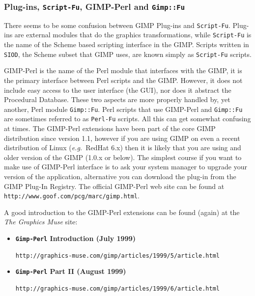 \documentclass[twoside,11pt]{article}
\newcommand{\htmladdnormallink}[2]{#1}
\newcommand{\latex}[1]{#1}
\begin{document}
\subsubsection{Plug-ins, {\tt Script-Fu}, GIMP-Perl and {\tt Gimp::Fu}}

There seems to be some confusion between GIMP Plug-ins and {\tt Script-Fu}.  Plug-ins are external modules that do the graphics transformations, while  {\tt Script-Fu} is the name of the Scheme based scripting interface in the GIMP.  Scripts written in {\tt SIOD}, the Scheme subset that GIMP uses, are known simply as {\tt Script-Fu} scripts.

\htmladdnormallink{GIMP-Perl}{http://www.goof.com/pcg/marc/gimp.html} is the name of the Perl module that interfaces with the GIMP, it is the primary interface between Perl scripts and the GIMP. However, it does not include easy access to the user interface (the GUI), nor does it abstract the Procedural Database. These two aspects are more properly handled by, yet another, Perl module {\tt Gimp::Fu}. Perl scripts that use GIMP-Perl and {\tt Gimp::Fu} are sometimes referred to as {\tt Perl-Fu} scripts. All this can get somewhat confusing at times. The GIMP-Perl extensions have been part of the core GIMP distribution since version 1.1, however if you are using GIMP on even a recent distribution of Linux ({\em e.g.\ }RedHat 6.x) then it is likely that you are using and older version of the GIMP (1.0.x or below). The simplest course if you want to make use of GIMP-Perl interface is to ask your system manager to upgrade your version of the application, alternative you can download the plug-in from the GIMP Plug-In Registry. \latex{The official GIMP-Perl web site can be found at {\tt http://www.goof.com/pcg/marc/gimp.html}.}

A good introduction to the GIMP-Perl extensions can be found (again) at the \htmladdnormallink{{\em The Graphics Muse}}{http://graphics-muse.com/} site:

\begin{itemize}
\item {\bf{\tt Gimp-Perl} Introduction (July 1999)}\\
\begin{small}\htmladdnormallink{{\tt http://graphics-muse.com/gimp/articles/1999/5/article.html}}{http://graphics-muse.com/gimp/articles/1999/5/article.html}\end{small}
\item {\bf{\tt Gimp-Perl} Part II (August 1999)}\\
\begin{small}\htmladdnormallink{{\tt http://graphics-muse.com/gimp/articles/1999/6/article.html}}{http://graphics-muse.com/gimp/articles/1999/6/article.html}\end{small}
\end{itemize}
\end{document}
